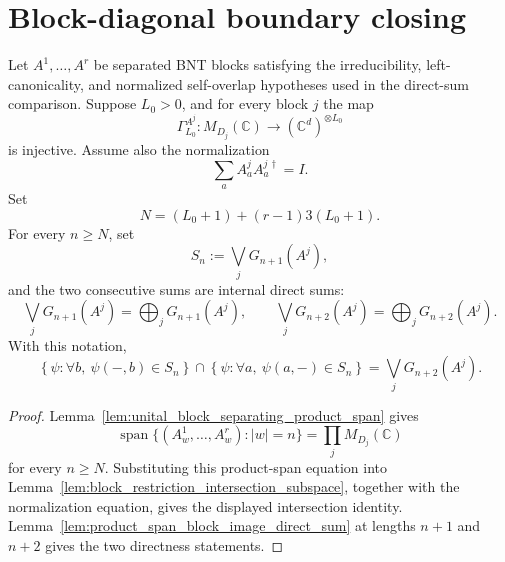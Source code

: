 \section{Block-diagonal boundary closing}\label{sec:block_diagonal_boundary_closing}

\begin{lemma}
    \label{lem:bnt_direct_sum_unital_block_intersection_ge}
    \leanok
    Let \(A^1,\ldots,A^r\) be separated BNT blocks satisfying the irreducibility,
    left-canonicality, and normalized self-overlap hypotheses used in the
    direct-sum comparison. Suppose \(L_0>0\), and for every block \(j\) the map
    \[
        \Gamma_{L_0}^{A^j}:M_{D_j}(\mathbb C)\to
        (\mathbb C^d)^{\otimes L_0}
    \]
    is injective. Assume also the normalization
    \[
        \sum_a A^j_aA^{j\,\dagger}_a=I .
    \]
    Set
    \[
        N=(L_0+1)+(r-1)3(L_0+1).
    \]
    For every \(n\ge N\), set
    \[
        S_n:=\bigvee_jG_{n+1}(A^j),
    \]
    and the two consecutive sums are internal direct sums:
    \[
        \bigvee_jG_{n+1}(A^j)
        =
        \bigoplus_jG_{n+1}(A^j),
        \qquad
        \bigvee_jG_{n+2}(A^j)
        =
        \bigoplus_jG_{n+2}(A^j).
    \]
    With this notation,
    \[
        \left\{\psi:\forall b,\ \psi(-,b)\in S_n\right\}
        \cap
        \left\{\psi:\forall a,\ \psi(a,-)\in S_n\right\}
        =
        \bigvee_jG_{n+2}(A^j).
    \]
\end{lemma}

\begin{proof}
    \leanok
    Lemma~\ref{lem:unital_block_separating_product_span} gives
    \[
        \operatorname{span}\{(A^1_w,\ldots,A^r_w):|w|=n\}
        =
        \prod_jM_{D_j}(\mathbb C)
    \]
    for every \(n\ge N\). Substituting this product-span equation into
    Lemma~\ref{lem:block_restriction_intersection_subspace}, together with the
    normalization equation, gives the displayed intersection identity.
    Lemma~\ref{lem:product_span_block_image_direct_sum} at lengths \(n+1\) and
    \(n+2\) gives the two directness statements.
\end{proof}

